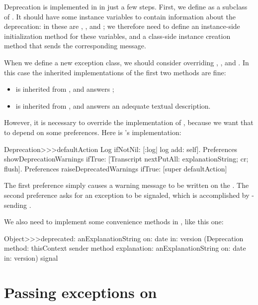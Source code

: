 \documentclass[a4paper,10pt,twoside]{book}
\begin{document}
Deprecation is implemented in \pharo in just a few steps.
First, we define  as a subclass of .
It should have some instance variables to contain information about the deprecation: in 
\pharo{} these are , ,  and ; we therefore need to define an instance-side initialization method for these variables, and a class-side instance creation method that sends the corresponding message.

When we define a new exception class, we should consider overriding , , and .
In this case the inherited implementations of the first two methods are fine:

\begin{itemize}
\item {} is inherited from , and answers ;
\item {} is inherited from , and answers an adequate textual description.
\end{itemize}

However, it is necessary to override the implementation of , because we want that to depend on some preferences.  Here is \pharo's implementation:
\begin{code}{}
Deprecation>>>defaultAction
	Log ifNotNil: [:log| log add: self].
	Preferences showDeprecationWarnings ifTrue:
		[Transcript nextPutAll: explanationString; cr; flush].
	Preferences raiseDeprecatedWarnings ifTrue:
		[super defaultAction]
\end{code}

The first preference simply causes a warning message to be written on the .  The second preference asks for an exception to be signaled, which is accomplished by \super-sending .

We also need to implement some convenience methods in , like this one:
\begin{code}{}
Object>>>deprecated: anExplanationString on: date in: version
	(Deprecation
		method: thisContext sender method
		explanation: anExplanationString
		on: date
		in: version) signal
\end{code}

\section{Passing exceptions on}
\end{document}
